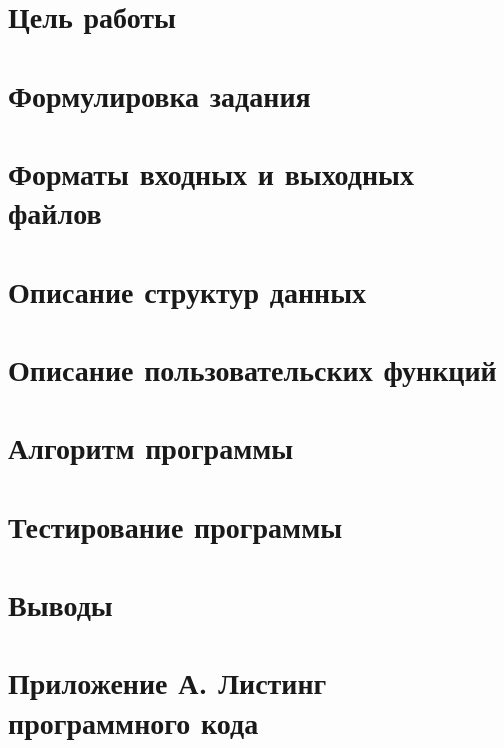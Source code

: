 



	
	
	\section*{Цель работы}
	

	\section*{Формулировка задания}
	

	\section*{Форматы входных и выходных файлов}
	

	\section*{Описание структур данных}
	

	\section*{Описание пользовательских функций}
	

	\section*{Алгоритм программы}
	

	\section*{Тестирование программы}
	

	\section*{Выводы}
	

	\section*{Приложение А. Листинг программного кода}
	

